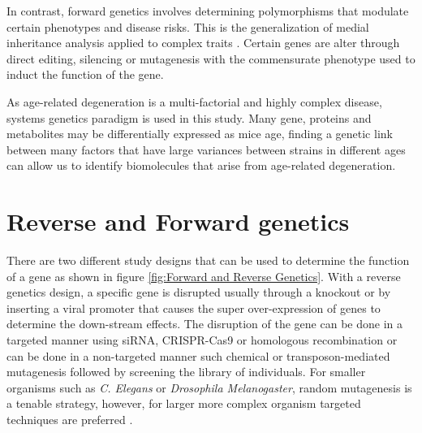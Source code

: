 \documentclass[a4paper,11pt,twoside]{book}
\begin{document}
	In contrast, forward genetics involves determining polymorphisms that modulate certain phenotypes and disease risks. This is the generalization of medial inheritance analysis applied to complex traits \citep{Williams2015TheAnalysis}. Certain genes are alter through direct editing, silencing or mutagenesis with the commensurate phenotype used to induct the function of the gene. 
	
	As age-related degeneration is a multi-factorial and highly complex disease, systems genetics paradigm is used in this study. Many gene, proteins and metabolites may be differentially expressed as mice age, finding a genetic link between many factors that have large variances between strains in different ages can allow us to identify biomolecules that arise from age-related degeneration.
		
	\section{Reverse and Forward genetics}
	
	There are two different study designs that can be used to determine the function of a gene as shown in figure \ref{fig:Forward and Reverse Genetics}. With a reverse genetics design, a specific gene is disrupted usually through a knockout or by inserting a viral promoter that causes the super over-expression of genes to determine the down-stream effects. The disruption of the gene can be done in a targeted manner using siRNA, CRISPR-Cas9 or homologous recombination or can be done in a non-targeted manner such chemical or transposon-mediated mutagenesis followed by screening the library of individuals\citep{MelindaB.TierneyandKurtH.Lamour2005}. For smaller organisms such as  \textit{C. Elegans} or \textit{Drosophila Melanogaster}, random mutagenesis is a tenable strategy, however, for larger more complex organism targeted techniques are preferred \citep{MelindaB.TierneyandKurtH.Lamour2005}.
		
\end{document}
